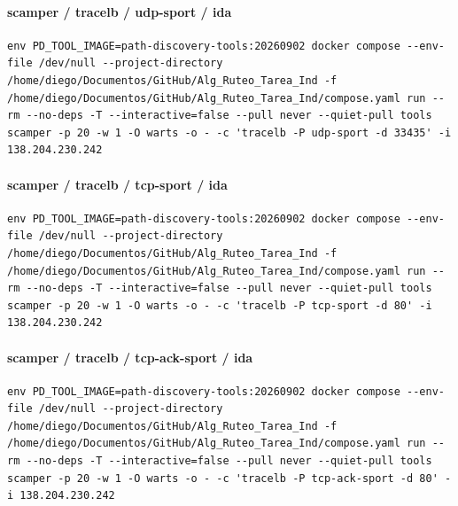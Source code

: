 \paragraph{scamper / tracelb / udp-sport / ida}
\begin{lstlisting}
env PD_TOOL_IMAGE=path-discovery-tools:20260902 docker compose --env-file /dev/null --project-directory /home/diego/Documentos/GitHub/Alg_Ruteo_Tarea_Ind -f /home/diego/Documentos/GitHub/Alg_Ruteo_Tarea_Ind/compose.yaml run --rm --no-deps -T --interactive=false --pull never --quiet-pull tools scamper -p 20 -w 1 -O warts -o - -c 'tracelb -P udp-sport -d 33435' -i 138.204.230.242
\end{lstlisting}
\paragraph{scamper / tracelb / tcp-sport / ida}
\begin{lstlisting}
env PD_TOOL_IMAGE=path-discovery-tools:20260902 docker compose --env-file /dev/null --project-directory /home/diego/Documentos/GitHub/Alg_Ruteo_Tarea_Ind -f /home/diego/Documentos/GitHub/Alg_Ruteo_Tarea_Ind/compose.yaml run --rm --no-deps -T --interactive=false --pull never --quiet-pull tools scamper -p 20 -w 1 -O warts -o - -c 'tracelb -P tcp-sport -d 80' -i 138.204.230.242
\end{lstlisting}
\paragraph{scamper / tracelb / tcp-ack-sport / ida}
\begin{lstlisting}
env PD_TOOL_IMAGE=path-discovery-tools:20260902 docker compose --env-file /dev/null --project-directory /home/diego/Documentos/GitHub/Alg_Ruteo_Tarea_Ind -f /home/diego/Documentos/GitHub/Alg_Ruteo_Tarea_Ind/compose.yaml run --rm --no-deps -T --interactive=false --pull never --quiet-pull tools scamper -p 20 -w 1 -O warts -o - -c 'tracelb -P tcp-ack-sport -d 80' -i 138.204.230.242
\end{lstlisting}
